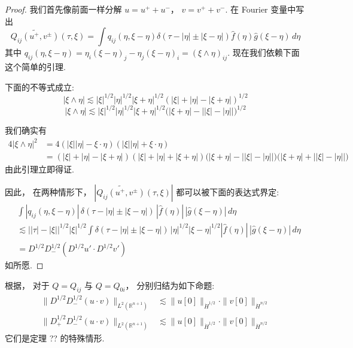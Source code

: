 \begin{proof}
我们首先像前面一样分解 $u = u^{+} + u^{-}$， $v = v^{+} + v^{-}$. 在 Fourier 变量中写出
\[
\widetilde{Q_{ij}(u^{+}, v^{\pm})}(\tau, \xi) = \int q_{ij}(\eta, \xi-\eta)\delta(\tau - |\eta| \pm |\xi-\eta|)\hat f(\eta)\hat g(\xi-\eta)\, d\eta
\]
其中 $q_{ij}(\eta, \xi-\eta) = \eta_i(\xi-\eta)_j - \eta_j(\xi-\eta)_i = (\xi\wedge\eta)_{ij}$. 现在我们依赖下面这个简单的引理.

\begin{lemma}\label{lem:c9-3.7}
下面的不等式成立:
\begin{equation}
|\xi \wedge \eta| \lesssim |\xi|^{1/2}|\eta|^{1/2}|\xi+\eta|^{1/2}(|\xi| + |\eta| - |\xi+\eta|)^{1/2}\label{eq:c9-399}
\end{equation}
\begin{equation}
|\xi \wedge \eta| \lesssim |\xi|^{1/2}|\eta|^{1/2}|\xi+\eta|^{1/2}\big(|\xi+\eta| - \big||\xi| - |\eta|\big|\big)^{1/2}\label{eq:c9-400}
\end{equation}
\end{lemma}

我们确实有
\[
\begin{aligned}
4|\xi \wedge \eta|^2 &= 4(|\xi||\eta| - \xi\cdot\eta)(|\xi||\eta| + \xi\cdot\eta)\\
&= (|\xi| + |\eta| - |\xi+\eta|)(|\xi| + |\eta| + |\xi+\eta|)\big(|\xi+\eta| - \big||\xi| - |\eta|\big|\big)\big(|\xi+\eta| + \big||\xi| - |\eta|\big|\big)
\end{aligned}
\]
由此引理立即得证.

因此， 在两种情形下， $|\widetilde{Q_{ij}(u^{+}, v^{\pm})}(\tau, \xi)|$ 都可以被下面的表达式界定:
\[
\begin{aligned}
&\int |q_{ij}(\eta, \xi-\eta)|\, \delta(\tau - |\eta| \pm |\xi-\eta|)\, |\hat f(\eta)|\, |\hat g(\xi-\eta)|\, d\eta\\
&\lesssim \big||\tau| - |\xi|\big|^{1/2}|\xi|^{1/2}\int\delta(\tau - |\eta| \pm |\xi-\eta|)\, |\eta|^{1/2}|\xi-\eta|^{1/2}|\hat f(\eta)|\, |\hat g(\xi-\eta)|\, d\eta\\
&= D^{1/2}D_-^{1/2}(D^{1/2}u'\cdot D^{1/2}v')
\end{aligned}
\]
如所愿.
\end{proof}

根据， 对于 $Q = Q_{ij}$ 与 $Q = Q_{0i}$，  分别归结为如下命题:
\[
\begin{aligned}
\|D^{1/2}D_-^{1/2}(u\cdot v)\|_{L^2(\mathbb{R}^{n+1})} &\lesssim \|u[0]\|_{\dot H^{1/2}}\cdot\|v[0]\|_{\dot H^{n/2}}\\
\|D_+^{1/2}D_-^{1/2}(u\cdot v)\|_{L^2(\mathbb{R}^{n+1})} &\lesssim \|u[0]\|_{\dot H^{1/2}}\cdot\|v[0]\|_{\dot H^{n/2}}
\end{aligned}
\]
它们是定理 ?? 的特殊情形.